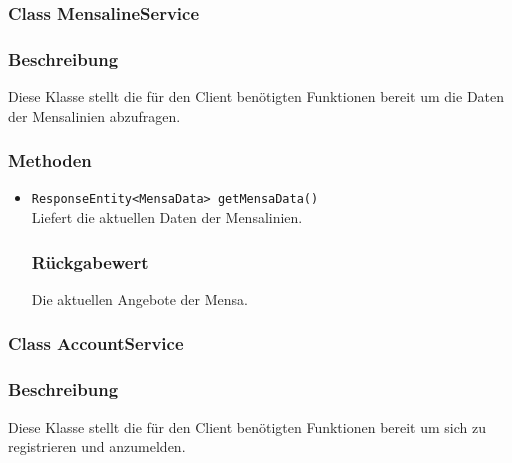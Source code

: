 \documentclass[a4paper]{scrreprt}
\begin{document}


\subsubsection{Class MensalineService}
\subsubsection*{Beschreibung}
Diese Klasse stellt die für den Client benötigten Funktionen bereit um die Daten der Mensalinien abzufragen. 

\subsubsection*{Methoden}
\begin{addmargin}[25pt]{0pt}
\begin{itemize}

\item \texttt{ResponseEntity<MensaData> getMensaData()}\\
	Liefert die aktuellen Daten der Mensalinien.

	\subsubsection*{Rückgabewert}
	Die aktuellen Angebote der Mensa.

\end{itemize}
\end{addmargin}

\subsubsection{Class AccountService}
\subsubsection*{Beschreibung}
Diese Klasse stellt die für den Client benötigten Funktionen bereit um sich zu registrieren und anzumelden. 
\end{document}
